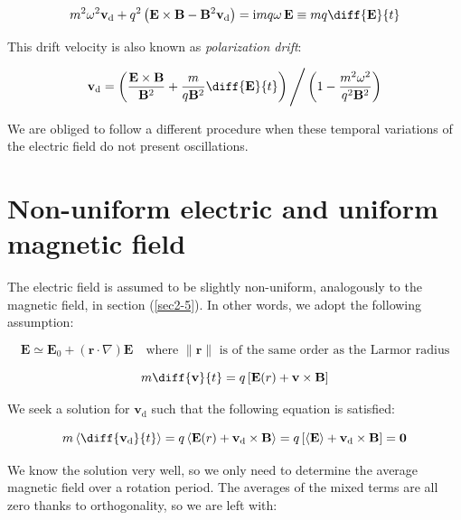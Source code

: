 \begin{equation}
    m^2\omega^2\mathbf{v}_\mathrm{d}+q^2\left(\mathbf{E}\times\mathbf{B}-\mathbf{B}^2\mathbf{v}_\mathrm{d}\right)=\mathrm{i}mq\omega\,\mathbf{E}\equiv mq\diff{\mathbf{E}}{t}
\end{equation}

This drift velocity is also known as \textit{polarization drift}:

\begin{equation}
    \mathbf{v}_\mathrm{d}=\left(\frac{\mathbf{E}\times\mathbf{B}}{\mathbf{B}^2}+\frac{m}{q\mathbf{B}^2}\diff{\mathbf{E}}{t}\right)\Bigg/\left(1-\frac{m^2\omega^2}{q^2\mathbf{B}^2}\right)
\end{equation}

We are obliged to follow a different procedure when these temporal variations of the electric field do not present oscillations.

\section{Non-uniform electric and uniform magnetic field}

The electric field is assumed to be slightly non-uniform, analogously to the magnetic field, in section (\ref{sec2-5}). In other words, we adopt the following assumption:

\begin{equation}
    \mathbf{E}\simeq\mathbf{E}_0+(\mathbf{r}\cdot\nabla)\mathbf{E}\quad\text{where }\|\mathbf{r}\|\text{ is of the same order as the Larmor radius}
\end{equation}

\begin{equation}
    m\diff{\mathbf{v}}{t}=q\left[\mathbf{E}(r)+\mathbf{v}\times\mathbf{B}\right]
\end{equation}

We seek a solution for $\mathbf{v}_\mathrm{d}$ such that the following equation is satisfied:

\begin{equation}
    m\left\langle\diff{\mathbf{v}_\mathrm{d}}{t}\right\rangle=q\left\langle\mathbf{E}(r)+\mathbf{v}_\mathrm{d}\times\mathbf{B}\right\rangle=q\left[\langle\mathbf{E}\rangle+\mathbf{v}_\mathrm{d}\times\mathbf{B}\right]=\mathbf{0}
\end{equation}

We know the solution very well, so we only need to determine the average magnetic field over a rotation period. The averages of the mixed terms are all zero thanks to orthogonality, so we are left with:

